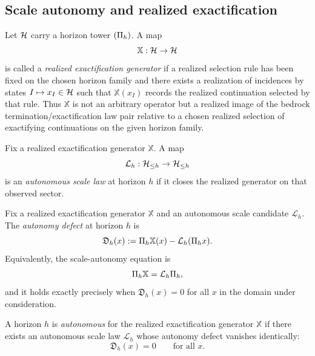 \subsection{Scale autonomy and realized exactification}

\begin{definition}
\label{def:realized-exactification-generator}
Let \(\mathcal{H}\) carry a horizon tower \((\Pi_{h})\). A map
\[
\mathbb X:\mathcal{H}\to\mathcal{H}
\]
is called a \emph{realized exactification generator} if a realized selection
rule has been fixed on the chosen horizon family and there exists a
realization of incidences by states \(I\mapsto x_I\in\mathcal{H}\) such that
\(\mathbb X(x_I)\) records the realized continuation selected by that rule.
Thus \(\mathbb X\) is not an arbitrary operator but a realized image of the
bedrock termination/exactification law pair relative to a chosen realized
selection of exactifying continuations on the given horizon family.
\end{definition}

\begin{definition}
\label{def:autonomous-scale-law}
Fix a realized exactification generator \(\mathbb X\). A map
\[
\mathcal L_h:\mathcal{H}_{\le h}\to\mathcal{H}_{\le h}
\]
is an \emph{autonomous scale law} at horizon \(h\) if it closes the realized
generator on that observed sector.
\end{definition}

\begin{definition}
\label{def:autonomy-defect}
Fix a realized exactification generator \(\mathbb X\) and an autonomous scale
candidate \(\mathcal L_h\). The \emph{autonomy defect} at horizon \(h\) is
\[
\mathfrak D_h(x)
:=
\Pi_{h}\mathbb X(x)-\mathcal L_h(\Pi_{h}x).
\]
Equivalently, the scale-autonomy equation is
\[
\Pi_{h}\mathbb X = \mathcal L_h\Pi_{h},
\]
and it holds exactly precisely when \(\mathfrak D_h(x)=0\) for all \(x\) in the
domain under consideration.
\end{definition}

\begin{definition}
\label{def:autonomous-horizon}
A horizon \(h\) is \emph{autonomous} for the realized exactification generator
\(\mathbb X\) if there exists an autonomous scale law \(\mathcal L_h\) whose
autonomy defect vanishes identically:
\[
\mathfrak D_h(x)=0
\qquad
\text{for all }x.
\]
\end{definition}

